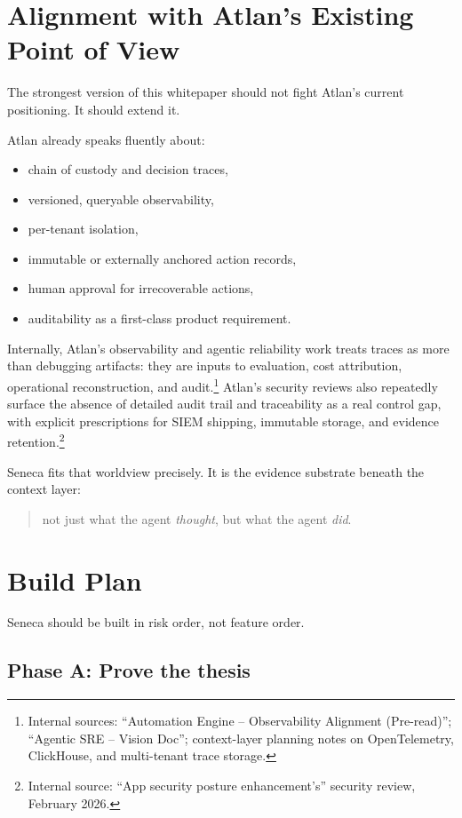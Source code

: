 \documentclass[11pt]{article}
\begin{document}
\section{Alignment with Atlan's Existing Point of View}

The strongest version of this whitepaper should not fight Atlan's current positioning. It should extend it.

Atlan already speaks fluently about:
\begin{itemize}[leftmargin=1.5em]
    \item chain of custody and decision traces,
    \item versioned, queryable observability,
    \item per-tenant isolation,
    \item immutable or externally anchored action records,
    \item human approval for irrecoverable actions,
    \item auditability as a first-class product requirement.
\end{itemize}

Internally, Atlan's observability and agentic reliability work treats traces as more than debugging artifacts: they are inputs to evaluation, cost attribution, operational reconstruction, and audit.\footnote{Internal sources: ``Automation Engine -- Observability Alignment (Pre-read)''; ``Agentic SRE -- Vision Doc''; context-layer planning notes on OpenTelemetry, ClickHouse, and multi-tenant trace storage.} Atlan's security reviews also repeatedly surface the absence of detailed audit trail and traceability as a real control gap, with explicit prescriptions for SIEM shipping, immutable storage, and evidence retention.\footnote{Internal source: ``App security posture enhancement's'' security review, February 2026.}

Seneca fits that worldview precisely. It is the evidence substrate beneath the context layer:
\begin{quote}
not just what the agent \emph{thought}, but what the agent \emph{did}.
\end{quote}

\section{Build Plan}

Seneca should be built in risk order, not feature order.

\subsection{Phase A: Prove the thesis}
\end{document}
